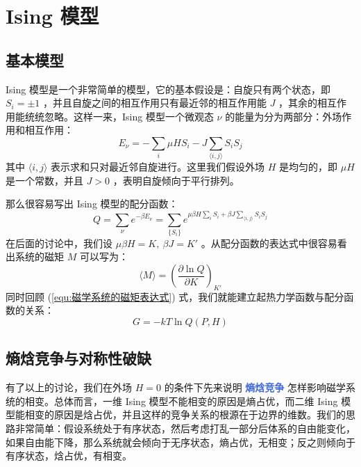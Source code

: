 \section{Ising 模型}\label{sec:Ising模型}

\subsection{基本模型}

Ising 模型是一个非常简单的模型，它的基本假设是：自旋只有两个状态，即 $S_i = \pm 1$ ，并且自旋之间的相互作用只有最近邻的相互作用能 $J$ ，其余的相互作用能统统忽略。这样一来，Ising 模型一个微观态 $\nu$ 的能量为分为两部分：外场作用和相互作用：
\begin{equation}\label{equ:Ising模型的哈密顿量}
    E_\nu = - \sum_i \mu H S_i-J \sum_{\langle i,j \rangle} S_i S_j
\end{equation}
其中 $\langle i,j \rangle$ 表示求和只对最近邻自旋进行。这里我们假设外场 $H$ 是均匀的，即 $\mu H$ 是一个常数，并且 $J>0$ ，表明自旋倾向于平行排列。

那么很容易写出 Ising 模型的配分函数：
\begin{equation}\label{equ:Ising模型的配分函数}
    Q = \sum_\nu e^{-\beta E_\nu} = \sum_{\{S_i\}} e^{\mu \beta H \sum_i  S_i + \beta J \sum_{\langle i,j \rangle} S_i S_j}
\end{equation}
在后面的讨论中，我们设 $\mu\beta H = K, ~\beta J = K'$ 。从配分函数的表达式中很容易看出系统的磁矩 $M$ 可以写为：
\begin{equation}\label{equ:Ising模型的磁矩表达式}
    \langle M \rangle = \left(\frac{\partial \ln Q}{\partial K}\right)_{K'}
\end{equation}
同时回顾 (\ref*{equ:磁学系统的磁矩表达式}) 式，我们就能建立起热力学函数与配分函数的关系：
\begin{equation}\label{equ:热力学函数与配分函数}
    G = -kT\ln Q(P,H)
\end{equation}


\subsection{熵焓竞争与对称性破缺}

有了以上的讨论，我们在外场 $H  =0$ 的条件下先来说明 \textcolor{RoyalBlue}{\textbf{\kaishu 熵焓竞争}} 怎样影响磁学系统的相变。总体而言，一维 Ising 模型不能相变的原因是熵占优，而二维 Ising 模型能相变的原因是焓占优，并且这样的竞争关系的根源在于边界的维数。我们的思路非常简单：假设系统处于有序状态，然后考虑打乱一部分后体系的自由能变化，如果自由能下降，那么系统就会倾向于无序状态，熵占优，无相变；反之则倾向于有序状态，焓占优，有相变。

